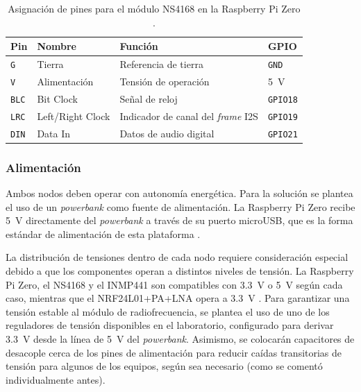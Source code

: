 \begin{table}[htb]
    \centering
    \caption{Asignación de pines para el módulo NS4168 en la Raspberry Pi Zero \cite{ns4168_datasheet}.}
    \label{tab:ns4168_pines}
    \begin{tabular}{@{}llp{3cm}l@{}}
        \toprule
        Pin & Nombre & Función & GPIO \\
        \midrule
        \texttt{G}   & Tierra           & Referencia de tierra                      & \texttt{GND} \\
        \texttt{V}   & Alimentación     & Tensión de operación                      & \SI{5}{\volt} \\
        \texttt{BLC} & Bit Clock        & Señal de reloj                            & \texttt{GPIO18} \\
        \texttt{LRC} & Left/Right Clock & Indicador de canal del \textit{frame} I2S & \texttt{GPIO19} \\
        \texttt{DIN} & Data In          & Datos de audio digital                    & \texttt{GPIO21} \\
        \bottomrule
    \end{tabular}
\end{table}

\subsubsection{Alimentación}

Ambos nodos deben operar con autonomía energética.
Para la solución se plantea el uso de un \textit{powerbank} como fuente de alimentación.
La Raspberry Pi Zero recibe \SI{5}{\volt} directamente del \textit{powerbank} a través de su puerto microUSB, que es la forma estándar de alimentación de esta plataforma \cite{adafruit_pizero}.

La distribución de tensiones dentro de cada nodo requiere consideración especial debido a que los componentes operan a distintos niveles de tensión.
La Raspberry Pi Zero, el NS4168 y el INMP441 son compatibles con \SI{3.3}{\volt} o \SI{5}{\volt} según cada caso, mientras que el NRF24L01+PA+LNA opera a \SI{3.3}{\volt} \cite{nordic}.
Para garantizar una tensión estable al módulo de radiofrecuencia, se plantea el uso de uno de los reguladores de tensión disponibles en el laboratorio, configurado para derivar \SI{3.3}{\volt} desde la línea de \SI{5}{\volt} del \textit{powerbank}.
Asimismo, se colocarán capacitores de desacople cerca de los pines de alimentación para reducir caídas transitorias de tensión para algunos de los equipos, según sea necesario (como se comentó individualmente antes).

